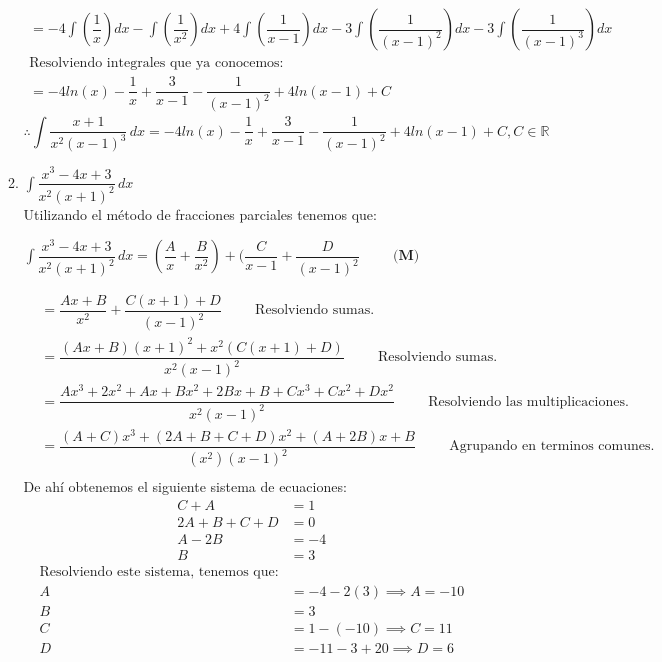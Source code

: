 \documentclass[letterpaper]{article}
\newcommand{\R}{\mathds{R}}
\renewcommand{\*}{\cdot}
\theoremstyle{definition}
\begin{document}
\begin{enumerate}
\begin{enumerate}
\begin{align*}
= -4\int(\dfrac{1}{x})dx -\int(\dfrac{1}{x^2})dx +4\int(\dfrac{1}{x-1})dx -3\int(\dfrac{1}{(x-1)^2})dx-3\int(\dfrac{1}{(x-1)^3})dx\\
\text{Resolviendo integrales que ya conocemos:}\\
=-4ln(x) -\dfrac{1}{x}+\dfrac{3}{x-1}-\dfrac{1}{(x-1)^2}+4ln(x-1)+C
\end{align*}
\[ \therefore \int \dfrac{x + 1}{x^2(x-1)^3} \, dx = -4ln(x) -\dfrac{1}{x}+\dfrac{3}{x-1}-\dfrac{1}{(x-1)^2}+4ln(x-1) + C, C\in \R \]
\item$\displaystyle \int \dfrac{x^3 - 4x + 3}{x^2(x+1)^2} \, dx$\\
Utilizando el método de fracciones parciales tenemos que:\\
\begin{center}
	$\int \dfrac{x^3 - 4x + 3}{x^2(x+1)^2} \, dx= (\dfrac{A}{x}+\dfrac{B}{x^2})+(\dfrac{C}{x-1}+\dfrac{D}{(x-1)^2}\hspace{1cm}{\textbf{(M)}}$
\end{center}
\begin{align*}
&=\dfrac{Ax+B}{x^2}+\dfrac{C(x+1)+D}{(x-1)^2}\hspace{1cm}\text{Resolviendo sumas.}\\
&=\dfrac{(Ax+B)(x+1)^2+x^2(C(x+1)+D)}{x^2(x-1)^2}\hspace{1cm}\text{Resolviendo sumas.}\\
&=\dfrac{Ax^3+2x^2+Ax+Bx^2+2Bx+B+Cx^3+Cx^2+Dx^2}{x^2(x-1)^2}\hspace{1cm}\text{Resolviendo las multiplicaciones.}\\
&= \dfrac{(A+C)x^3+(2A+B+C+D)x^2+(A+2B)x+B}{(x^2)(x-1)^2}\hspace{1cm}\text{Agrupando en terminos comunes.}\\
\end{align*}
De ahí obtenemos el siguiente sistema de ecuaciones:
\begin{align*}
C+A &= 1\\
2A+B+C+D &= 0\\
A-2B &= -4\\
B&=3
\end{align*}
\begin{align*}
\text{Resolviendo este sistema, tenemos que:}\\
A &= -4-2(3) \implies A = -10\\
B &= 3\\
C &= 1-(-10) \implies C=11\\
D &= -11-3+20 \implies D=6\\

\end{align*}
\end{enumerate}
\end{enumerate}
\end{document}
